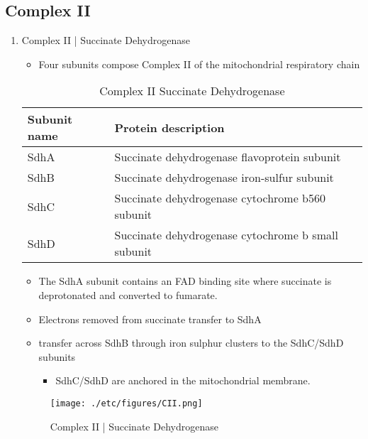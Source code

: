 \documentclass{scrartcl}
\begin{document}
\subsection{Complex II}
\label{sec:org19f80f7}
\begin{enumerate}
\item Complex II | Succinate Dehydrogenase
\label{sec:org124564b}
\begin{itemize}
\item Four subunits compose Complex II of the mitochondrial respiratory chain
\end{itemize}

\begin{table}[htbp]
\caption{\label{tab:org0fce49f}
Complex II Succinate Dehydrogenase}
\centering
\begin{tabular}{ll}
Subunit name & Protein description\\
\hline
SdhA & Succinate dehydrogenase flavoprotein subunit\\
SdhB & Succinate dehydrogenase iron-sulfur subunit\\
SdhC & Succinate dehydrogenase cytochrome b560 subunit\\
SdhD & Succinate dehydrogenase cytochrome b small subunit\\
\end{tabular}
\end{table}

\begin{itemize}
\item The SdhA subunit contains an FAD binding site where succinate
is deprotonated and converted to fumarate.
\end{itemize}

{\small{}}

\begin{itemize}
\item Electrons removed from succinate transfer to SdhA
\item transfer across SdhB through iron sulphur clusters to the SdhC/SdhD subunits
\begin{itemize}
\item SdhC/SdhD are anchored in the mitochondrial membrane.
\end{itemize}
\end{itemize}

\begin{figure}[htbp]
\centering
\texttt{[image: ./etc/figures/CII.png]}
\caption[cII]{\label{fig:orgea722bb}
Complex II | Succinate Dehydrogenase}
\end{figure}


\end{enumerate}
\end{document}
